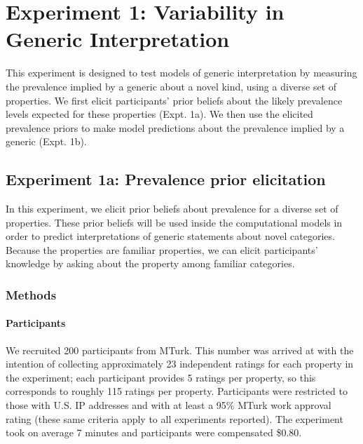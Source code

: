 \documentclass[floatsintext,doc]{apa6}
\let\oldparagraph\paragraph
\renewcommand{\paragraph}[1]{\oldparagraph{#1}\mbox{}}
\begin{document}
\hypertarget{experiment-1}{%
\section{Experiment 1: Variability in Generic Interpretation}\label{experiment-1}}

This experiment is designed to test models of generic interpretation by measuring the prevalence implied by a generic about a novel kind, using a diverse set of properties.
We first elicit participants' prior beliefs about the likely prevalence levels expected for these properties (Expt. 1a).
We then use the elicited prevalence priors to make model predictions about the prevalence implied by a generic (Expt. 1b).

\hypertarget{experiment-1a-prevalence-prior-elicitation}{%
\subsection{Experiment 1a: Prevalence prior elicitation}\label{experiment-1a-prevalence-prior-elicitation}}

In this experiment, we elicit prior beliefs about prevalence for a diverse set of properties.
These prior beliefs will be used inside the computational models in order to predict interpretations of generic statements about novel categories. %
Because the properties are familiar properties, we can elicit participants' knowledge by asking about the property among familiar  categories.

\hypertarget{methods}{%
\subsubsection{Methods}\label{methods}}

\hypertarget{participants-1}{%
\paragraph{Participants}\label{participants-1}}
We recruited 200 participants from MTurk.
This number was arrived at with the intention of collecting approximately 23 independent ratings for each property in the experiment; each participant provides 5 ratings per property, so this corresponds to roughly 115 ratings per property. 
Participants were restricted to those with U.S. IP addresses and with at least a 95\% MTurk work approval rating (these same criteria apply to all experiments reported).
The experiment took on average 7 minutes and participants were compensated \$0.80.
\end{document}

